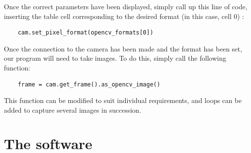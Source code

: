 Once the correct parameters have been displayed, simply call up this line of code, inserting the table cell corresponding
to the desired format (in this case, cell 0) :
\begin{verbatim}
    cam.set_pixel_format(opencv_formats[0])
\end{verbatim}
Once the connection to the camera has been made and the format has been set, our program will need to take images.
To do this, simply call the following function:
\begin{verbatim}
    frame = cam.get_frame().as_opencv_image()
\end{verbatim}
This function can be modified to suit individual requirements, and loops can be added to capture several images in succession.
\newpage
\section{The software}
